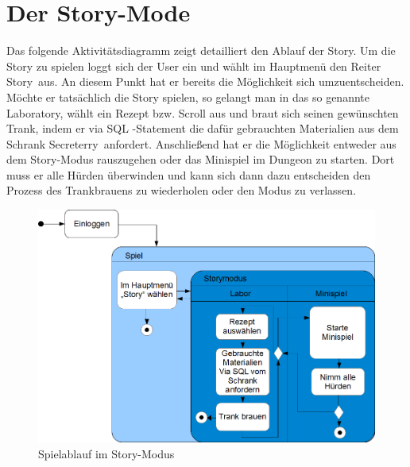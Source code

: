 \section{Der Story-Mode}
Das folgende Aktivit\"atsdiagramm zeigt detailliert den Ablauf der Story. Um die Story zu spielen loggt sich der User ein und w\"ahlt im Hauptmen\"u den Reiter
\glqq Story\grqq~aus. An diesem Punkt hat er bereits die M\"oglichkeit sich umzuentscheiden. M\"ochte er tats\"achlich die Story spielen, so gelangt man in das 
so genannte Laboratory, w\"ahlt ein Rezept bzw. Scroll aus und braut sich seinen gew\"unschten Trank, indem er via SQL -Statement die daf\"ur gebrauchten 
Materialien aus dem Schrank \glqq Secreterry\grqq~anfordert.
Anschlie{\ss}end hat er die M\"oglichkeit entweder aus dem Story-Modus rauszugehen oder das Minispiel im Dungeon zu starten. Dort muss er alle  H\"urden 
\"uberwinden und kann sich dann dazu entscheiden den Prozess des Trankbrauens zu wiederholen oder den Modus zu verlassen.
\begin{figure}[ht]
\centering
\includegraphics[width=1\textwidth]{figures/story_mode_activ.PNG}
\caption{Spielablauf im Story-Modus}
\end{figure}





